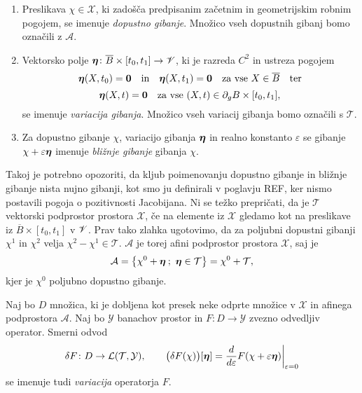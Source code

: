\begin{definicija}
	\begin{enumerate}
		\item Preslikava $\chi\in\mathcal{X}$, ki zadošča predpisanim začetnim in geometrijskim robnim pogojem,
			se imenuje \emph{dopustno gibanje}. Množico vseh dopustnih gibanj bomo označili z $\mathcal{A}$.
		\item Vektorsko polje $\boldsymbol \eta\colon\overline{B}\times [t_0,t_1]\to\mathscr V$, ki je razreda $C^2$ in
			ustreza pogojem
			\[ \vek{\eta}(X,t_0)=\vek{0}\quad \textrm{in} \quad\vek{\eta}(X,t_1)=\vek{0}\quad \textrm{za vse}\ X\in\overline{B}\quad\textrm{ter} \]
			\[ \vek{\eta}(X,t)=\vek{0}\quad \textrm{za vse}\ (X,t)\in \partial_g B\times [t_0,t_1], \]
			se imenuje \emph{variacija gibanja}. Množico vseh variacij gibanja bomo ozna\-čili s $\mathcal{T}$.
		\item Za dopustno gibanje $\chi$, variacijo gibanja $\boldsymbol \eta$ in realno konstanto $\varepsilon$ se gibanje
			$\chi+\varepsilon\boldsymbol \eta$ imenuje \emph{bližnje gibanje} gibanja $\chi$.
	\end{enumerate}
\end{definicija}

Takoj je potrebno opozoriti, da kljub poimenovanju dopustno gibanje in bližnje gibanje nista nujno gibanji,
kot smo ju definirali v poglavju REF, ker nismo postavili pogoja o pozitivnosti Jacobijana.
Ni se težko prepričati, da je $\mathcal{T}$ vektorski podprostor prostora $\mathcal{X}$, če na elemente iz $\mathcal{X}$
gledamo kot na preslikave iz $\overline{B}\times [t_0,t_1]$ v $\mathscr V$.
Prav tako zlahka ugotovimo, da za poljubni dopustni gibanji $\chi^1$ in $\chi^2$
velja $\chi^2-\chi^1\in\mathcal{T}$. $\mathcal{A}$ je torej afini podprostor prostora $\mathcal{X}$, saj je
\[ \mathcal{A}=\big\{ \chi^0+\boldsymbol \eta\: ;\ \boldsymbol \eta\in\mathcal{T} \big\}=\chi^0+\mathcal{T}, \]
kjer je $\chi^0$ poljubno dopustno gibanje.

\begin{definicija}
	Naj bo $D$ množica, ki je dobljena kot presek neke odprte množice v $\mathcal{X}$ in afinega
	podprostora $\mathcal{A}$. Naj bo $\mathcal{Y}$ banachov prostor in $F\colon D\to\mathcal{Y}$
	zvezno odvedljiv operator. Smerni odvod
	\[
		\delta F\colon D\to\L(\mathcal{T},\mathcal{Y}),\qquad
		\big(\delta F(\chi)\big)[\vek{\eta}]=\at{\frac{d}{d\varepsilon}F(\chi+\varepsilon\vek{\eta})}{\varepsilon=0}
	\]
	se imenuje tudi \emph{variacija} operatorja $F$.
\end{definicija}

